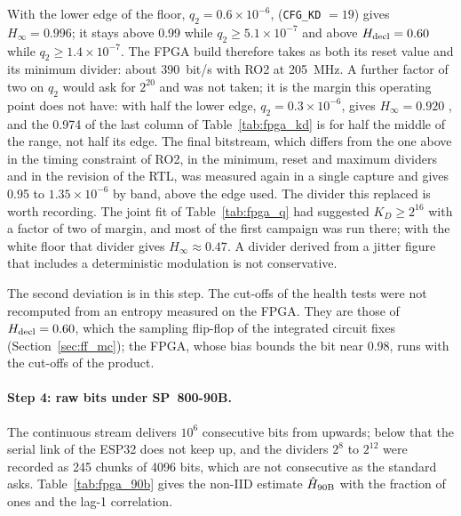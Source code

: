 With the lower edge of the floor, $q_2 = 0.6\times10^{-6}$, 
(\texttt{CFG\_KD} $= 19$) gives $H_\infty = 0.996$; it stays above 0.99
while $q_2 \ge 5.1\times10^{-7}$ and above $H_{\mathrm{decl}} = 0.60$ while
$q_2 \ge 1.4\times10^{-7}$. The \ac{FPGA} build therefore takes 
as both its reset value and its minimum divider: about 390~bit/s with RO2
at 205~MHz. A further factor of two on $q_2$ would ask for $2^{20}$ and
was not taken; it is the margin this operating point does not have: with
half the lower edge, $q_2 = 0.3\times10^{-6}$,  gives
$H_\infty = 0.920$ \est{}, and the 0.974 of the last column of
Table~\ref{tab:fpga_kd} is for half the middle of the range, not half
its edge. The
final bitstream, which differs from the one above in the timing
constraint of RO2, in the minimum, reset and maximum dividers and in the
revision of the \ac{RTL}, was measured again in a single capture and
gives 0.95 to $1.35\times10^{-6}$ by band, above the edge used. The
divider this replaced is worth recording. The joint fit of
Table~\ref{tab:fpga_q} had suggested $K_D \ge 2^{16}$ with a factor of
two of margin, and most of the first campaign was run there; with the
white floor that divider gives $H_\infty \approx 0.47$. A divider derived
from a jitter figure that includes a deterministic modulation is not
conservative.

The second deviation is in this step. The cut-offs of the health tests
were not recomputed from an entropy measured on the \ac{FPGA}. They are
those of $H_{\mathrm{decl}} = 0.60$, which the sampling flip-flop of the integrated
circuit fixes (Section~\ref{sec:ff_mc}); the \ac{FPGA}, whose bias
bounds the bit near 0.98, runs with the cut-offs of the product.

\paragraph{Step 4: raw bits under SP~800-90B.} The continuous stream
delivers $10^6$ consecutive bits from  upwards; below that the
serial link of the ESP32 does not keep up, and the dividers $2^{8}$ to
$2^{12}$ were recorded as 245 chunks of 4096 bits, which are not
consecutive as the standard asks. Table~\ref{tab:fpga_90b} gives the
non-IID estimate $\hat{H}_{\mathrm{90B}}$ with the fraction of ones and the lag-1
correlation.

